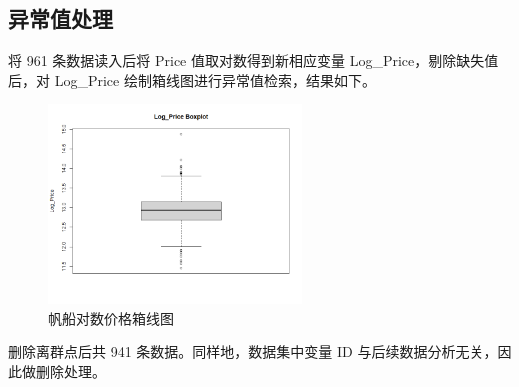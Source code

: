 \documentclass[a4paper,12pt,onecolumn,oneside]{article}
\begin{document}
\subsection{异常值处理}
将 961 条数据读入后将 Price 值取对数得到新相应变量 Log\_Price，剔除缺失值后，对 Log\_Price 绘制箱线图进行异常值检索，结果如下。
	\begin{figure}[H]
	\centering
	\includegraphics[width=0.6\textwidth]{res/yichang.png}
	\caption{帆船对数价格箱线图}
	\label{fig:box2}
\end{figure}
删除离群点后共 941 条数据。同样地，数据集中变量 ID 与后续数据分析无关，因此做删除处理。
\end{document}
